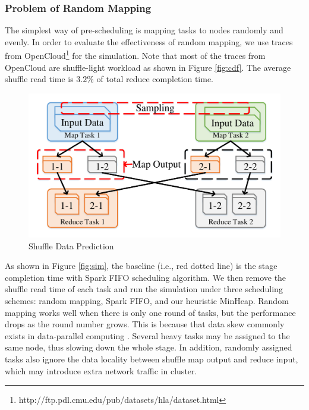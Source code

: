 \subsubsection{Problem of Random Mapping}\label{randomassign}
The simplest way of pre-scheduling is mapping tasks to nodes randomly and evenly. 
In order to evaluate the effectiveness of random mapping, we use traces from OpenCloud\footnote{\label{fn:trace}http://ftp.pdl.cmu.edu/pub/datasets/hla/dataset.html} for the simulation.
Note that most of the traces from OpenCloud are shuffle-light workload as shown in Figure \ref{fig:cdf}. 
The average shuffle read time is $3.2\%$ of total reduce completion time.

\begin{figure}
	\centering
	\includegraphics[width=0.5\linewidth]{fig/shuffle}
	\caption{Shuffle Data Prediction}
	\label{fig:shuffle}
	\vspace{-1em}
\end{figure}
As shown in Figure \ref{fig:sim}, the baseline (i.e., red dotted line) is the stage completion time with Spark FIFO scheduling algorithm. 
We then remove the shuffle read time of each task and run the simulation under three scheduling schemes: random mapping, Spark FIFO, and our heuristic MinHeap.
Random mapping works well when there is only one round of tasks, but the performance drops as the round number grows. 
This is because that data skew commonly exists in data-parallel computing \cite{skewtune, reining, gufler2012load}. 
Several heavy tasks may be assigned to the same node, thus slowing down the whole stage. 
In addition, randomly assigned tasks also ignore the data locality between shuffle map output and reduce input, which may introduce extra network traffic in cluster.

